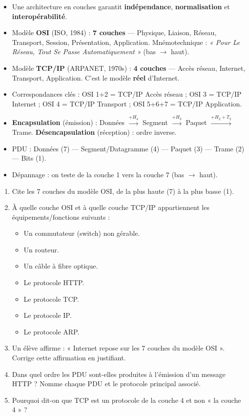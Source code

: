 \documentclass[11pt]{article}
\begin{document}
\begin{aretenir}
\begin{itemize}
\item Une architecture en couches garantit \textbf{indépendance}, \textbf{normalisation} et \textbf{interopérabilité}.
\item Modèle \textbf{OSI} (ISO, 1984) : \textbf{7 couches} — Physique, Liaison, Réseau, Transport, Session, Présentation, Application. Mnémotechnique : \emph{« Pour Le Réseau, Tout Se Passe Automatiquement »} (bas $\rightarrow$ haut).
\item Modèle \textbf{TCP/IP} (ARPANET, 1970s) : \textbf{4 couches} — Accès réseau, Internet, Transport, Application. C'est le modèle \textbf{réel} d'Internet.
\item Correspondances clés : OSI 1+2 = TCP/IP Accès réseau ; OSI 3 = TCP/IP Internet ; OSI 4 = TCP/IP Transport ; OSI 5+6+7 = TCP/IP Application.
\item \textbf{Encapsulation} (émission) : Données $\xrightarrow{+H_4}$ Segment $\xrightarrow{+H_3}$ Paquet $\xrightarrow{+H_2+T_2}$ Trame. \textbf{Désencapsulation} (réception) : ordre inverse.
\item PDU : Données (7) — Segment/Datagramme (4) — Paquet (3) — Trame (2) — Bits (1).
\item Dépannage : on teste de la couche 1 vers la couche 7 (bas $\rightarrow$ haut).
\end{itemize}
\end{aretenir}

\begin{exercice}
\begin{enumerate}
\item Cite les 7 couches du modèle OSI, de la plus haute (7) à la plus basse (1).
\item À quelle couche OSI et à quelle couche TCP/IP appartiennent les équipements/fonctions suivants :
  \begin{itemize}
  \item Un commutateur (switch) non gérable.
  \item Un routeur.
  \item Un câble à fibre optique.
  \item Le protocole HTTP.
  \item Le protocole TCP.
  \item Le protocole IP.
  \item Le protocole ARP.
  \end{itemize}
\item Un élève affirme : « Internet repose sur les 7 couches du modèle OSI ». Corrige cette affirmation en justifiant.
\item Dans quel ordre les PDU sont-elles produites à l'émission d'un message HTTP ? Nomme chaque PDU et le protocole principal associé.
\item Pourquoi dit-on que TCP est un protocole de la couche 4 et non « la couche 4 » ?
\end{enumerate}
\end{exercice}
\end{document}
